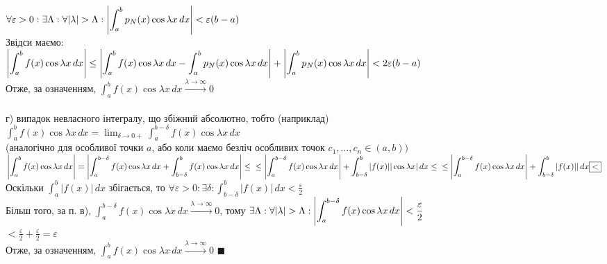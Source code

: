 \documentclass{math_library}
\begin{document}
$\displaystyle \forall \varepsilon>0: \exists \Lambda: \forall |\lambda| > \Lambda: \abs{\int_a^b p_N(x) \cos \lambda x \,dx} < \varepsilon(b-a)$\\
Звідси маємо:\\
$\displaystyle \abs{\int_a^b f(x) \cos \lambda x \,dx} \leq \abs{\int_a^b f(x) \cos \lambda x \,dx-\int_a^b p_N(x) \cos \lambda x \,dx} + \abs{\int_a^b p_N(x) \cos \lambda x \,dx} \\ < 2\varepsilon(b-a)$\\
Отже, за означенням, $\displaystyle \int_a^b f(x) \cos \lambda x \,dx \overset{\lambda \to \infty}{\to} 0$\\
\bigskip \\
г) випадок невласного інтегралу, що збіжний абсолютно, тобто (наприклад) \\ $\displaystyle \int_a^b f(x) \cos \lambda x \,dx = \lim_{\delta \to 0+} \int_a^{b-\delta} f(x) \cos \lambda x \,dx$
\\
(аналогічно для особливої точки $a$, або коли маємо безліч особливих точок $c_1,\dots,c_n \in (a,b))$\\
$\displaystyle \abs{\int_a^b f(x) \cos \lambda x \,dx} = \abs{\int_a^{b-\delta} f(x) \cos \lambda x \,dx + \int_{b-\delta}^b f(x) \cos \lambda x \,dx} \leq \\ \leq \abs{\int_a^{b-\delta} f(x) \cos \lambda x \,dx} + \int_{b-\delta}^b |f(x)| |\cos \lambda x| \,dx \leq \\ \leq \abs{\int_a^{b-\delta} f(x) \cos \lambda x \,dx} + \int_{b-\delta}^b |f(x)| | \,dx \boxed{<}$\\
Оскільки $\displaystyle \int_a^b |f(x)|\,dx$ збігається, то $\displaystyle \forall \varepsilon>0: \exists \delta: \int_{b-\delta}^b |f(x)|\,dx < \frac{\varepsilon}{2}$\\
Більш того, за п. в), $\displaystyle \int_a^{b-\delta} f(x) \cos \lambda x \,dx \overset{\lambda \to \infty}{\to} 0$, тому $\displaystyle \exists \Lambda: \forall |\lambda|>\Lambda: \abs{\int_a^{b-\delta} f(x) \cos \lambda x \,dx} < \frac{\varepsilon}{2}$\\
$\displaystyle \boxed{<} \frac{\varepsilon}{2} + \frac{\varepsilon}{2} = \varepsilon$\\
Отже, за означенням, $\displaystyle \int_a^b f(x) \cos \lambda x \,dx \overset{\lambda \to \infty}{\to} 0$ $\blacksquare$
\bigskip \\
\end{document}
